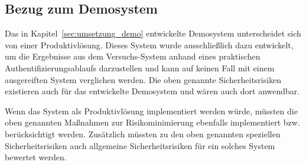 
\subsection{Bezug zum Demosystem}

Das in Kapitel~\ref{sec:umsetzung_demo} entwickelte Demosystem unterscheidet sich von einer Produktivlösung.
Dieses System wurde ausschließlich dazu entwickelt, um die Ergebnisse aus dem Versuchs-System anhand eines praktischen Authentifizierungsablaufs darzustellen und kann auf keinen Fall mit einem ausgereiften System verglichen werden.
Die oben genannte Sicherheitsrisiken existieren auch für das entwickelte Demosystem und wären auch dort anwendbar.

Wenn das System als Produktivlösung implementiert werden würde, müssten die oben genannten Maßnahmen zur Risikominimierung ebenfalls implementiert bzw. berücksichtigt werden.
Zusätzlich müssten zu den oben genannten speziellen Sicherheitsrisiken auch allgemeine Sicherheitsrisiken für ein solches System bewertet werden.


































































